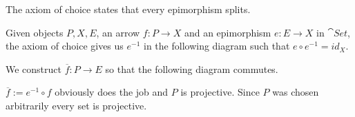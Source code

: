 
The axiom of choice states that every epimorphism splits.

Given objects $P, X, E$, an arrow $f : P → X$ and an epimorphism $e : E → X$ in $\cat{Set}$, the axiom of choice gives us $e^{-1}$ in the following diagram such that $e ∘ e^{-1} = id_X$.


We construct $\overline{f} : P → E$ so that the following diagram commutes.


$\overline{f} := e^{-1} ∘ f$ obviously does the job and $P$ is projective. Since $P$ was chosen arbitrarily every set is projective.

